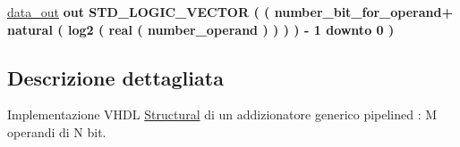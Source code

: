 \begin{DoxyCompactItemize}
\item 
\hypertarget{classgeneric__adder__pipelined_ga7087cf66799b189f1ad9c93f82a39a50}{\hyperlink{group___majority_voter_ga7087cf66799b189f1ad9c93f82a39a50}{data\+\_\+out}  {\bfseries {\bfseries \textcolor{vhdlchar}{out}\textcolor{vhdlchar}{ }}} {\bfseries \textcolor{vhdlchar}{S\+T\+D\+\_\+\+L\+O\+G\+I\+C\+\_\+\+V\+E\+C\+T\+O\+R}\textcolor{vhdlchar}{ }\textcolor{vhdlchar}{(}\textcolor{vhdlchar}{ }\textcolor{vhdlchar}{(}\textcolor{vhdlchar}{ }\textcolor{vhdlchar}{ }\textcolor{vhdlchar}{ }\textcolor{vhdlchar}{ }\textcolor{vhdlchar}{number\+\_\+bit\+\_\+for\+\_\+operand}\textcolor{vhdlchar}{+}\textcolor{vhdlchar}{ }\textcolor{vhdlchar}{ }\textcolor{vhdlchar}{ }\textcolor{vhdlchar}{natural}\textcolor{vhdlchar}{ }\textcolor{vhdlchar}{(}\textcolor{vhdlchar}{ }\textcolor{vhdlchar}{log2}\textcolor{vhdlchar}{ }\textcolor{vhdlchar}{(}\textcolor{vhdlchar}{ }\textcolor{vhdlchar}{real}\textcolor{vhdlchar}{ }\textcolor{vhdlchar}{(}\textcolor{vhdlchar}{ }\textcolor{vhdlchar}{number\+\_\+operand}\textcolor{vhdlchar}{ }\textcolor{vhdlchar}{ }\textcolor{vhdlchar}{)}\textcolor{vhdlchar}{ }\textcolor{vhdlchar}{ }\textcolor{vhdlchar}{ }\textcolor{vhdlchar}{)}\textcolor{vhdlchar}{ }\textcolor{vhdlchar}{ }\textcolor{vhdlchar}{ }\textcolor{vhdlchar}{)}\textcolor{vhdlchar}{ }\textcolor{vhdlchar}{)}\textcolor{vhdlchar}{ }\textcolor{vhdlchar}{-\/}\textcolor{vhdlchar}{ } \textcolor{vhdldigit}{1} \textcolor{vhdlchar}{ }\textcolor{vhdlchar}{downto}\textcolor{vhdlchar}{ }\textcolor{vhdlchar}{ } \textcolor{vhdldigit}{0} \textcolor{vhdlchar}{ }\textcolor{vhdlchar}{)}\textcolor{vhdlchar}{ }} }\label{classgeneric__adder__pipelined_ga7087cf66799b189f1ad9c93f82a39a50}

\end{DoxyCompactItemize}


\subsection{Descrizione dettagliata}
Implementazione V\+H\+D\+L \hyperlink{classgeneric__adder__pipelined_1_1_structural}{Structural} di un addizionatore generico pipelined \+: M operandi di N bit. 


